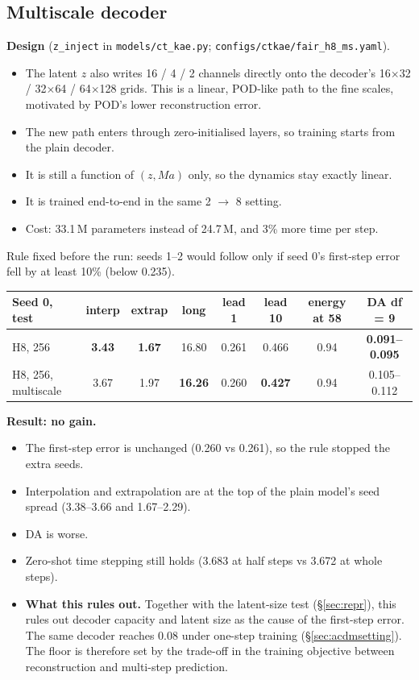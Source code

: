 \subsection{Multiscale decoder}\label{sec:multiscale}

\textbf{Design} (\texttt{z\_inject} in \texttt{models/ct\_kae.py};
\texttt{configs/ctkae/fair\_h8\_ms.yaml}).
\begin{itemize}
\item The latent $z$ also writes 16 / 4 / 2 channels directly onto the decoder's 16$\times$32 /
  32$\times$64 / 64$\times$128 grids. This is a linear, POD-like path to the fine scales,
  motivated by POD's lower reconstruction error.
\item The new path enters through zero-initialised layers, so training starts from the plain
  decoder.
\item It is still a function of $(z, Ma)$ only, so the dynamics stay exactly linear.
\item It is trained end-to-end in the same 2 $\to$ 8 setting.
\item Cost: 33.1\,M parameters instead of 24.7\,M, and 3\% more time per step.
\end{itemize}
Rule fixed before the run: seeds 1--2 would follow only if seed 0's first-step error fell by at
least 10\% (below 0.235).

\begin{center}\small
\begin{tabular}{lccccccc}
\toprule
Seed 0, test & interp & extrap & long & lead 1 & lead 10 & energy at 58 & DA df = 9\\
\midrule
H8, 256              & \textbf{3.43} & \textbf{1.67} & 16.80 & 0.261 & 0.466 & 0.94 & \textbf{0.091--0.095}\\
H8, 256, multiscale  & 3.67 & 1.97 & \textbf{16.26} & 0.260 & \textbf{0.427} & 0.94 & 0.105--0.112\\
\bottomrule
\end{tabular}
\end{center}

\textbf{Result: no gain.}
\begin{itemize}
\item The first-step error is unchanged (0.260 vs 0.261), so the rule stopped the extra
  seeds.
\item Interpolation and extrapolation are at the top of the plain model's seed spread
  (3.38--3.66 and 1.67--2.29).
\item DA is worse.
\item Zero-shot time stepping still holds (3.683 at half steps vs 3.672 at whole steps).
\item \textbf{What this rules out.} Together with the latent-size test (\S\ref{sec:repr}),
  this rules out decoder capacity and latent size as the cause of the first-step error. The
  same decoder reaches 0.08 under one-step training (\S\ref{sec:acdmsetting}). The floor is
  therefore set by the trade-off in the training objective between reconstruction and
  multi-step prediction.
\end{itemize}
